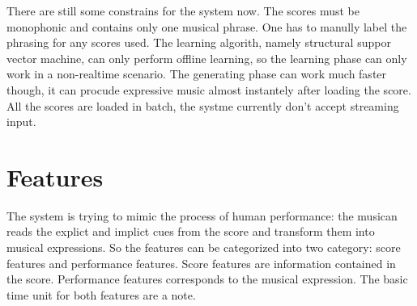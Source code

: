 There are still some constrains for the system now. The scores must be monophonic and contains only one musical phrase. One has to manully label the phrasing for any scores used. The learning algorith, namely structural suppor vector machine, can only perform offline learning, so the learning phase can only work in a non-realtime scenario. The generating phase can work much faster though, it can procude expressive music almost instantely after loading the score. All the scores are loaded in batch, the systme currently don't accept streaming input.


   \section{Features}
   The system is trying to mimic the process of human performance: the musican reads the explict and implict cues from the score and transform them into musical expressions. So the features can be categorized into two category: score features and performance features.  Score features are information contained in the score. Performance features corresponds to the musical expression. The basic time unit for both features are a note. 
